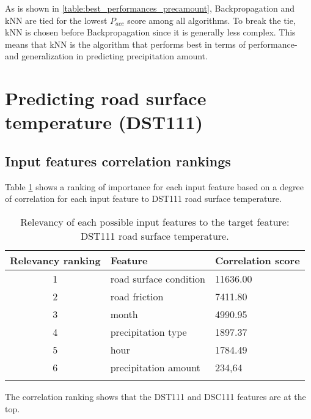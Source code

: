 	As is shown in \ref{table:best_performances_precamount}, Backpropagation and kNN are tied for the lowest $P_{acc}$ score among all algorithms. To break the tie, kNN is chosen before Backpropagation since it is generally less complex. This means that kNN is the algorithm that performs best in terms of performance- and generalization in predicting precipitation amount. 


\section{Predicting road surface temperature (DST111)}
	\subsection{Input features correlation rankings}
	Table \ref{table:feature_comparison_dst111} shows a ranking of importance for each input feature based on a degree of correlation for each input feature to DST111 road surface temperature.

	\begin{table}[H]
		\centering
		\caption{Relevancy of each possible input features to the target feature: DST111 road surface temperature. }
		\begin{tabular}[3]{c | l | l }
    			Relevancy ranking & Feature & Correlation score  \\
			 \hline
			1 & road surface condition & 11636.00 \\
			2 & road friction & 7411.80 \\
			3 & month & 4990.95 \\
			4 & precipitation type & 1897.37 \\
			5 & hour & 1784.49 \\
			6 & precipitation amount & 234,64 \\
 
			\label{table:feature_comparison_dst111}
		\end{tabular}
	\end{table}

	The correlation ranking shows that the DST111 and DSC111 features are at the top.

